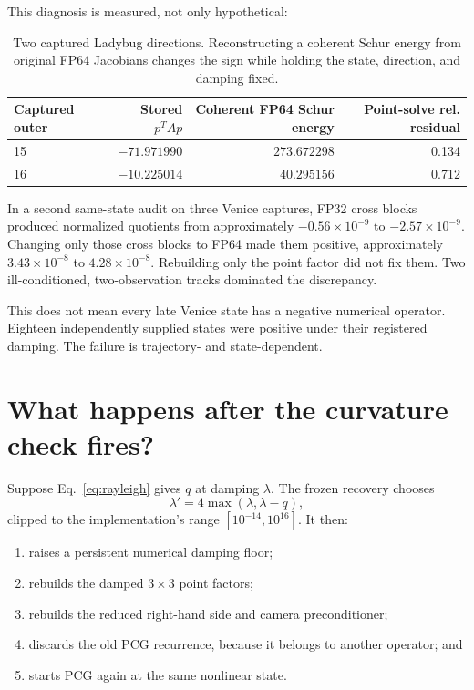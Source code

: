 \documentclass[11pt]{article}
\begin{document}
This diagnosis is measured, not only hypothetical:

\begin{table}[ht]
\centering
\small
\caption{Two captured Ladybug directions.  Reconstructing a coherent Schur energy from original FP64 Jacobians changes the sign while holding the state, direction, and damping fixed.}
\begin{tabular}{@{}lrrr@{}}
\toprule
Captured outer & Stored $p^TAp$ & Coherent FP64 Schur energy & Point-solve rel. residual\\
\midrule
15 & $-71.971990$ & $273.672298$ & 0.134\\
16 & $-10.225014$ & $40.295156$ & 0.712\\
\bottomrule
\end{tabular}
\end{table}

In a second same-state audit on three Venice captures, FP32 cross blocks produced normalized quotients from approximately $-0.56\times10^{-9}$ to $-2.57\times10^{-9}$.  Changing only those cross blocks to FP64 made them positive, approximately $3.43\times10^{-8}$ to $4.28\times10^{-8}$.  Rebuilding only the point factor did not fix them.  Two ill-conditioned, two-observation tracks dominated the discrepancy.

This does not mean every late Venice state has a negative numerical operator.  Eighteen independently supplied states were positive under their registered damping.  The failure is trajectory- and state-dependent.

\section{What happens after the curvature check fires?}

Suppose Eq.~\eqref{eq:rayleigh} gives $q$ at damping $\lambda$.  The frozen recovery chooses
\begin{equation}
  \lambda'=4\max(\lambda,\lambda-q), \label{eq:plain-repair}
\end{equation}
clipped to the implementation's range $[10^{-14},10^{16}]$.  It then:

\begin{enumerate}
  \item raises a persistent numerical damping floor;
  \item rebuilds the damped $3\times3$ point factors;
  \item rebuilds the reduced right-hand side and camera preconditioner;
  \item discards the old PCG recurrence, because it belongs to another operator; and
  \item starts PCG again at the same nonlinear state.
\end{enumerate}
\end{document}
